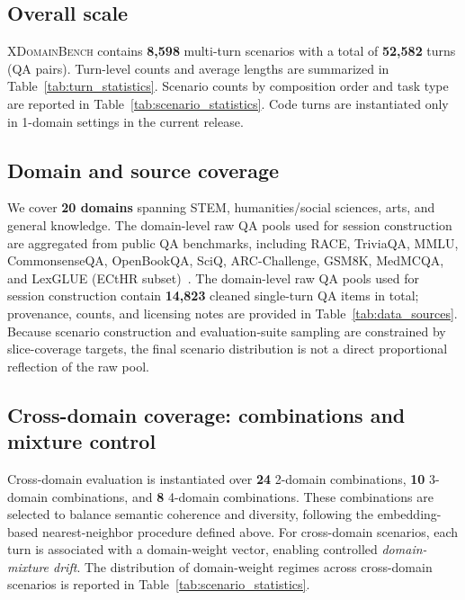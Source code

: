 \subsection{Overall scale}
\textsc{XDomainBench} contains \textbf{8,598} multi-turn scenarios with a total of \textbf{52,582} turns (QA pairs). Turn-level counts and average lengths are summarized in Table~\ref{tab:turn_statistics}. Scenario counts by composition order and task type are reported in Table~\ref{tab:scenario_statistics}. Code turns are instantiated only in 1-domain settings in the current release.

\subsection{Domain and source coverage}
We cover \textbf{20 domains} spanning STEM, humanities/social sciences, arts, and general knowledge.
The domain-level raw QA pools used for session construction are aggregated from public QA benchmarks, including RACE, TriviaQA, MMLU, CommonsenseQA, OpenBookQA, SciQ, ARC-Challenge, GSM8K, MedMCQA, and LexGLUE (ECtHR subset)~\citep{lai-etal-2017-race,joshi-etal-2017-triviaqa,hendrycks2021mmlu,talmor-etal-2019-commonsenseqa,mihaylov-etal-2018-suit,welbl-etal-2017-crowdsourcing,clark2018arc,cobbe2021training,pal2022medmcqa,chalkidis-etal-2022-lexglue}. 
The domain-level raw QA pools used for session construction contain \textbf{14,823} cleaned single-turn QA items in total; provenance, counts, and licensing notes are provided in Table~\ref{tab:data_sources}.
Because scenario construction and evaluation-suite sampling are constrained by slice-coverage targets, the final scenario distribution is not a direct proportional reflection of the raw pool.

\subsection{Cross-domain coverage: combinations and mixture control}
Cross-domain evaluation is instantiated over \textbf{24} 2-domain combinations, \textbf{10} 3-domain combinations, and \textbf{8} 4-domain combinations. These combinations are selected to balance semantic coherence and diversity, following the embedding-based nearest-neighbor procedure defined above. For cross-domain scenarios, each turn is associated with a domain-weight vector, enabling controlled \emph{domain-mixture drift}. The distribution of domain-weight regimes across cross-domain scenarios is reported in Table~\ref{tab:scenario_statistics}.

